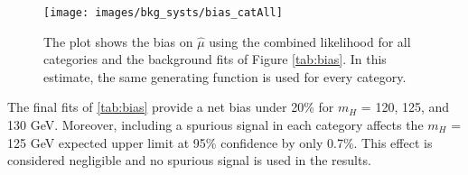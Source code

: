 \begin{figure}[h!]
    \centering
    \texttt{[image: images/bkg\_systs/bias\_catAll]}
    \caption[The net bias of the combined background model.]
    {The plot shows the bias on $\hat{\mu}$ using the combined likelihood for all categories and the background fits of Figure \ref{tab:bias}. In this estimate, the same generating function is used for every category.}
    \label{fig:bias_correlation}
\end{figure}
The final fits of \ref{tab:bias} provide a net bias under 20\% for $m_H$ = 120, 125, and  130 GeV. Moreover, including a spurious signal in each category affects the $m_H$ = 125 GeV expected upper limit at 95\% confidence by only 0.7\%. This effect is considered negligible and no spurious signal is used in the results. 
